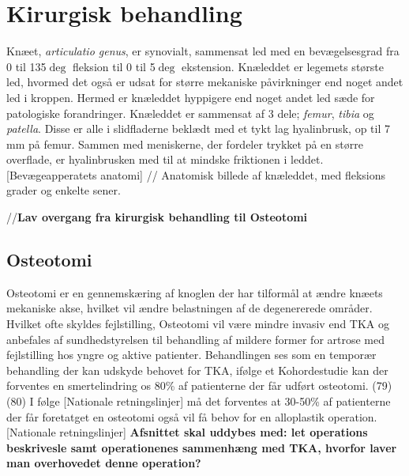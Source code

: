 \section{Kirurgisk behandling}

Knæet, \textit{articulatio genus}, er synovialt, sammensat led med en bevægelsesgrad fra 0 til 135$\deg$ fleksion til 0 til 5$\deg$ ekstension. Knæleddet er legemets største led, hvormed det også er udsat for større mekaniske påvirkninger end noget andet led i kroppen. Hermed er knæleddet hyppigere end noget andet led sæde for patologiske forandringer. Knæleddet er sammensat af 3 dele; \textit{femur}, \textit{tibia} og \textit{patella}. Disse er alle i slidfladerne beklædt med et tykt lag hyalinbrusk, op til 7 mm på femur. Sammen med meniskerne, der fordeler trykket på en større overflade, er hyalinbrusken med til at mindske friktionen i leddet. [Bevægeapperatets anatomi]
//
Anatomisk billede af knæleddet, med fleksions grader og enkelte sener. 

//\textbf{Lav overgang fra kirurgisk behandling til Osteotomi}
%

\subsection{Osteotomi}
Osteotomi er en gennemskæring af knoglen der har tilformål at ændre knæets mekaniske akse, hvilket vil ændre belastningen af de degenererede områder. Hvilket ofte skyldes fejlstilling, Osteotomi vil være mindre invasiv end TKA og anbefales af sundhedstyrelsen til behandling af mildere former for artrose med fejlstilling hos yngre og aktive patienter. Behandlingen ses som en temporær behandling der kan udskyde behovet for TKA, ifølge et Kohordestudie kan der forventes en smertelindring os 80\% af patienterne der får udført osteotomi. (79)(80) I følge [Nationale retningslinjer] må det forventes at 30-50\% af patienterne der får foretatget en osteotomi også vil få behov for en alloplastik operation. [Nationale retningslinjer]  \textbf{Afsnittet skal uddybes med: let operations beskrivesle samt operationenes sammenhæng med TKA, hvorfor laver man overhovedet denne operation?}

